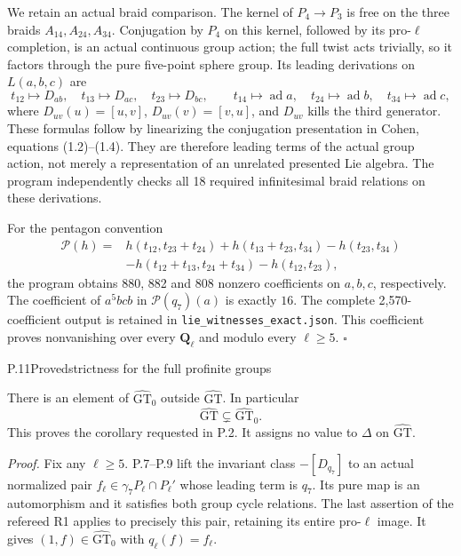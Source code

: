 We retain an actual braid comparison. The kernel of
$P_4\to P_3$ is free on the three braids $A_{14},A_{24},A_{34}$.
Conjugation by $P_4$ on this kernel, followed by its pro-$\ell$
completion, is an actual continuous group action; the full twist
acts trivially, so it factors through the pure five-point sphere
group. Its leading derivations on $L(a,b,c)$ are
\[
 t_{12}\mapsto D_{ab},\quad t_{13}\mapsto D_{ac},\quad
 t_{23}\mapsto D_{bc},\qquad
 t_{14}\mapsto\operatorname{ad}a,\quad
 t_{24}\mapsto\operatorname{ad}b,\quad
 t_{34}\mapsto\operatorname{ad}c,
\]
where $D_{uv}(u)=[u,v]$, $D_{uv}(v)=[v,u]$, and $D_{uv}$
kills the third generator. These formulas follow by linearizing
the conjugation presentation in Cohen, equations (1.2)--(1.4).
They are therefore leading terms of the actual group action,
not merely a representation of an unrelated presented Lie algebra.
The program independently checks all 18 required infinitesimal
braid relations on these derivations.

For the pentagon convention
\[
\begin{split}
\mathcal P(h)={}&h(t_{12},t_{23}+t_{24})
 +h(t_{13}+t_{23},t_{34})-h(t_{23},t_{34})\\
 &-h(t_{12}+t_{13},t_{24}+t_{34})-h(t_{12},t_{23}),
\end{split}
\]
the program obtains 880, 882 and 808 nonzero coefficients on
$a,b,c$, respectively. The coefficient of $a^5bcb$ in
$\mathcal P(q_7)(a)$ is exactly $16$. The complete 2,570-coefficient
output is retained in \texttt{lie\_witnesses\_exact.json}.
This coefficient proves nonvanishing over every $\mathbf Q_\ell$
and modulo every $\ell\geq5$. \hfill$\square$

\begin{statement}{P.11}{Proved}{strictness for the full profinite groups}
\end{statement}
There is an element of $\widehat{\mathrm{GT}}_0$ outside
$\widehat{\mathrm{GT}}$. In particular
\[
             \widehat{\mathrm{GT}}
                    \subsetneq\widehat{\mathrm{GT}}_0.
\]
This proves the corollary requested in P.2. It assigns no value to
$\Delta$ on $\widehat{\mathrm{GT}}$.

\emph{Proof.}
Fix any $\ell\geq5$. P.7--P.9 lift the invariant class
$-[D_{q_7}]$ to an actual normalized pair
$f_\ell\in\gamma_7P_\ell\cap P_\ell'$ whose leading term is $q_7$.
Its pure map is an automorphism and it satisfies both group cycle
relations. The last assertion of the refereed R1 applies to
precisely this pair, retaining its entire pro-$\ell$ image. It
gives $(1,f)\in\widehat{\mathrm{GT}}_0$ with
$q_\ell(f)=f_\ell$.

